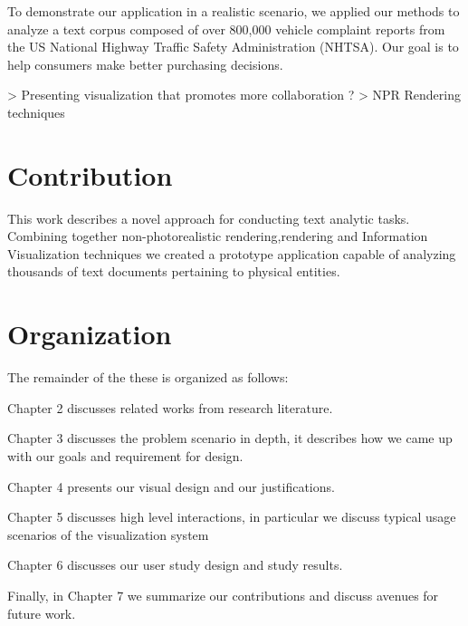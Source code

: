  
 To demonstrate our application in a realistic scenario, we applied our methods
 to analyze a text corpus composed of over 800,000 vehicle complaint reports
 from the US National Highway Traffic Safety Administration (NHTSA). Our goal is
 to help consumers make better purchasing decisions.
 
  
 
 > Presenting visualization that promotes more collaboration ? > NPR Rendering techniques
 
 \section{Contribution}
 This work describes a novel approach for conducting text analytic tasks.
 Combining together non-photorealistic rendering,\threed rendering and
 Information Visualization techniques we created a prototype application capable
 of analyzing thousands of text documents pertaining to physical entities.
 

 
 \section{Organization}
 The remainder of the these is organized as follows:
 
 \noindent Chapter 2 discusses related works from research literature. 
 
 \noindent Chapter 3 discusses the problem scenario in depth, it describes how
 we came up with our goals and requirement for design.
 
 \noindent Chapter 4 presents our visual design and our justifications. 
 
 \noindent Chapter 5 discusses high level interactions, in particular we
 discuss typical usage scenarios of the visualization system
 
 \noindent Chapter 6 discusses our user study design and study results. 
 
 \noindent Finally, in Chapter 7 we summarize our contributions and discuss
 avenues for future work. 
  
 
  